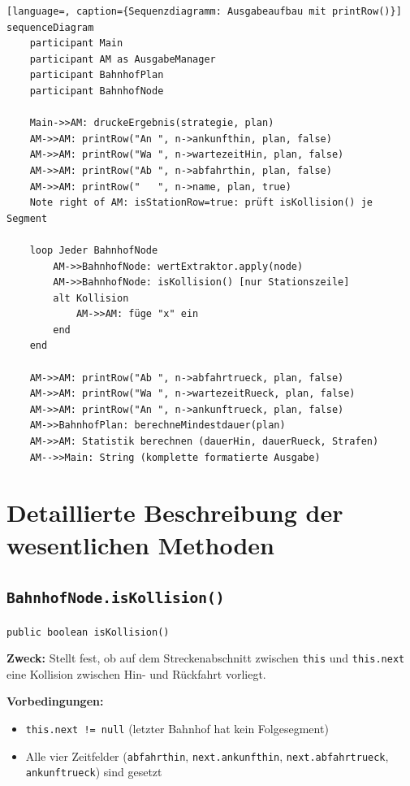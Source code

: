 \documentclass[12pt,a4paper]{article}
\begin{document}
\begin{lstlisting}[language=, caption={Sequenzdiagramm: Ausgabeaufbau mit printRow()}]
sequenceDiagram
    participant Main
    participant AM as AusgabeManager
    participant BahnhofPlan
    participant BahnhofNode

    Main->>AM: druckeErgebnis(strategie, plan)
    AM->>AM: printRow("An ", n->ankunfthin, plan, false)
    AM->>AM: printRow("Wa ", n->wartezeitHin, plan, false)
    AM->>AM: printRow("Ab ", n->abfahrthin, plan, false)
    AM->>AM: printRow("   ", n->name, plan, true)
    Note right of AM: isStationRow=true: prüft isKollision() je Segment

    loop Jeder BahnhofNode
        AM->>BahnhofNode: wertExtraktor.apply(node)
        AM->>BahnhofNode: isKollision() [nur Stationszeile]
        alt Kollision
            AM->>AM: füge "x" ein
        end
    end

    AM->>AM: printRow("Ab ", n->abfahrtrueck, plan, false)
    AM->>AM: printRow("Wa ", n->wartezeitRueck, plan, false)
    AM->>AM: printRow("An ", n->ankunftrueck, plan, false)
    AM->>BahnhofPlan: berechneMindestdauer(plan)
    AM->>AM: Statistik berechnen (dauerHin, dauerRueck, Strafen)
    AM-->>Main: String (komplette formatierte Ausgabe)
\end{lstlisting}

\section{Detaillierte Beschreibung der wesentlichen Methoden}
\label{sec:methoden}

\subsection{\texttt{BahnhofNode.isKollision()}}

\begin{tcolorbox}[colback=gray!5, colframe=gray!40, title=Methodensignatur]
\texttt{public boolean isKollision()}
\end{tcolorbox}

\textbf{Zweck:} Stellt fest, ob auf dem Streckenabschnitt zwischen \texttt{this}
und \texttt{this.next} eine Kollision zwischen Hin- und Rückfahrt vorliegt.

\textbf{Vorbedingungen:}
\begin{itemize}
  \item \texttt{this.next != null} (letzter Bahnhof hat kein Folgesegment)
  \item Alle vier Zeitfelder (\texttt{abfahrthin}, \texttt{next.ankunfthin},
        \texttt{next.abfahrtrueck}, \texttt{ankunftrueck}) sind gesetzt
\end{itemize}
\end{document}
